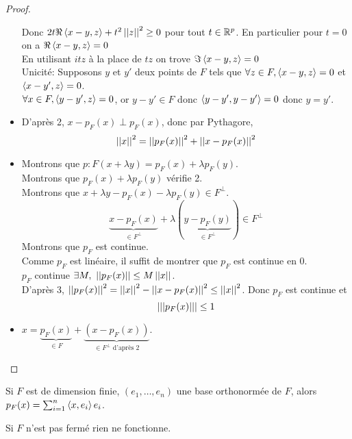 \begin{proof}
\begin{itemize}
		      Donc $2t\Re \left\langle x - y, z \right\rangle + t^2 \left|\left|z\right|\right|^2 \geq 0$ pour tout $t \in \mathbb{R}^p$.
		      En particulier pour $t = 0$ on a $\Re \left\langle x - y, z \right\rangle = 0$ \\
		      En utilisant $itz$ à la place de $tz$ on trove $\Im \left\langle x - y, z \right\rangle = 0$\\

		      Unicité: Supposons $y$ et $y'$ deux points de $F$ tels que $\forall z \in F, \left\langle x - y, z \right\rangle = 0$ et $\left\langle x - y', z \right\rangle = 0$.\\
		      $\forall x \in F, \left\langle y - y', z \right\rangle = 0$, or $y - y' \in F$ donc $\left\langle y - y', y - y' \right\rangle = 0$ donc $y = y'$.
		\item D'après 2, $x - p_F(x) \perp p_F(x)$, donc par Pythagore,
		      $$ \left|\left|x\right|\right|^2 = \left|\left|p_F(x)\right|\right|^2 + \left|\left|x - p_F(x)\right|\right|^2 $$
		\item Montrons que $p:F( x + \lambda y) = p_F(x) + \lambda p_F(y)$.\\
		      Montrons que $p_F(x) + \lambda p_F(y)$ vérifie 2.\\
		      Montrons que $x + \lambda y - p_F(x) - \lambda p_F(y) \in F^\perp$.\\
		      $$ \underbrace{x - p_F(x)}_{\in F^\perp} + \lambda ( \underbrace{y - p_F(y)}_{\in F^\perp}) \in F^\perp $$
		      Montrons que $p_F$ est continue.\\
		      Comme $p_F$ est linéaire, il suffit de montrer que $p_F$ est continue en 0.\\
		      $p_F$ continue \ssi $\exists M, \ \left|\left|p_F(x)\right|\right| \leq M \left|\left|x\right|\right|$.\\

		      D'après 3, $\left|\left|p_F(x)\right|\right|^2 = \left|\left|x\right|\right|^2 - \left|\left|x - p_F(x)\right|\right|^2 \leq \left|\left|x\right|\right|^2$. Donc $p_F$ est continue et
		      $$\left|\left|\left|p_F(x)\right|\right|\right| \leq 1 $$ %

		\item $x = \underbrace{p_F(x)}_{\in F} + \underbrace{(x - p_F(x))}_{\in F^\perp \text { d'après 2}}$.
	\end{itemize}
\end{proof}

\begin{remarque}
	Si $F$ est de dimension finie, $(e_1, \ldots, e_n)$ une base orthonormée de $F$, alors $p_F(x) = \sum_{i=1}^n \left\langle x, e_i \right\rangle e_i$.
\end{remarque}

\begin{remarque}
	Si $F$ n'est pas fermé rien ne fonctionne.
\end{remarque}

